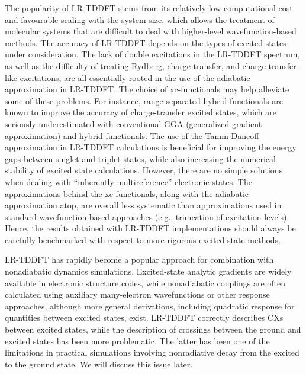 \documentclass[9pt,bestpractices]{livecoms}
\begin{document}
The popularity of LR-TDDFT stems from its relatively low computational cost and favourable scaling with the system size, which allows the treatment of molecular systems that are difficult to deal with higher-level wavefunction-based methods. The accuracy of LR-TDDFT depends on the types of excited states under consideration. The lack of double excitations in the LR-TDDFT spectrum,\cite{elliott2011perspectives,levine06} as well as the difficulty of treating Rydberg, charge-transfer,\cite{dreuw2003long} and charge-transfer-like excitations,\cite{kuritz2011charge} are all essentially rooted in the use of the adiabatic approximation in LR-TDDFT.\cite{tddftcarsten} The choice of xc-functionals may help alleviate some of these problems. For instance, range-separated hybrid functionals are known to improve the accuracy of charge-transfer excited states,\cite{laurent2013td} which are seriously underestimated with conventional GGA (generalized gradient approximation) and hybrid functionals. The use of the Tamm-Dancoff approximation in LR-TDDFT calculations is beneficial\cite{hirata99} for improving the energy gaps between singlet and triplet states,\cite{peach2011influence} while also increasing the numerical stability of excited state calculations.\cite{oxirane_I,tapavicza08} However, there are no simple solutions when dealing with ``inherently multireference'' electronic states. The approximations behind the xc-functionals, along with the adiabatic approximation atop, are overall less systematic than approximations used in standard wavefunction-based approaches (e.g., truncation of excitation levels). Hence, the results obtained with LR-TDDFT implementations should always be carefully benchmarked with respect to more rigorous excited-state methods.

LR-TDDFT has rapidly become a popular approach for combination with nonadiabatic dynamics simulations.\cite{curchod2013trajectory,barbatti2014surface} Excited-state analytic gradients are widely available in electronic structure codes, while nonadiabatic couplings are often calculated using auxiliary many-electron wavefunctions\cite{tapavicza07,tavernelli09b,Tavernelli2009,tavernelli2010nonadiabatic,curchod2013trajectory,mitric2008nonadiabatic} or other response approaches\cite{chernyak2000density,hu08,send_first-order_2010}, although more general derivations, including quadratic response for quantities between excited states, exist.\cite{li2014first,ou_first-order_2015,wang_nac-tddft_2021} LR-TDDFT correctly describes CXs between excited states, while the description of crossings between the ground and excited states has been more problematic.\cite{levine06,taylor2023description} The latter has been one of the limitations in practical simulations involving nonradiative decay from the excited to the ground state.\cite{barbatti2014surface} We will discuss this issue later.
\end{document}
